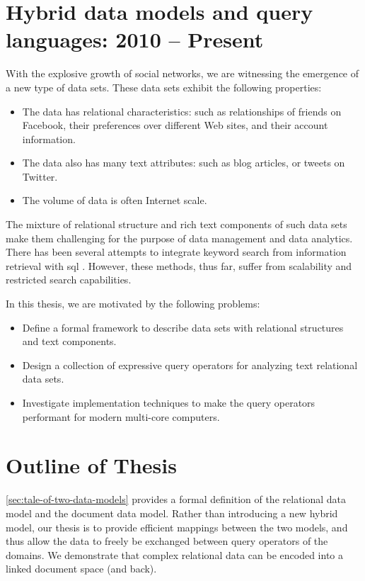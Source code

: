 	\section{Hybrid data models and query languages: 2010 -- Present}
		With the explosive growth of social networks, we are witnessing the emergence of a new type of data sets.  These data sets exhibit the following properties:
		
		\begin{itemize}
			\item The data has relational characteristics: such as relationships of friends on Facebook, their preferences over different Web sites, and their account information.
			\item The data also has many text attributes: such as blog articles, or tweets on Twitter.
			\item The volume of data is often Internet scale.
		\end{itemize}
		
		The mixture of relational structure and rich text components of such data sets make them challenging for the purpose of data management and data analytics.  There has been several attempts to integrate keyword search from information retrieval with \gls{sql} \cite{banks-02, fuzzy-11, ir-03}.  However, these methods, thus far, suffer from scalability and restricted search capabilities.
		
		In this thesis, we are motivated by the following problems:
		
		\begin{itemize}
			\item Define a formal framework to describe data sets with relational structures and text components.
			\item Design a collection of expressive query operators for analyzing text relational data sets.
			\item Investigate implementation techniques to make the query operators performant for modern multi-core computers.
		\end{itemize}
		
	\section{Outline of Thesis}
		\cref{sec:tale-of-two-data-models} provides a formal definition of the relational data model and the document data model.  Rather than introducing a new hybrid model, our thesis is to provide efficient mappings between the two models, and thus allow the data to freely be exchanged between query operators of the domains.  We demonstrate that complex relational data can be encoded into a linked document space (and back).
		
